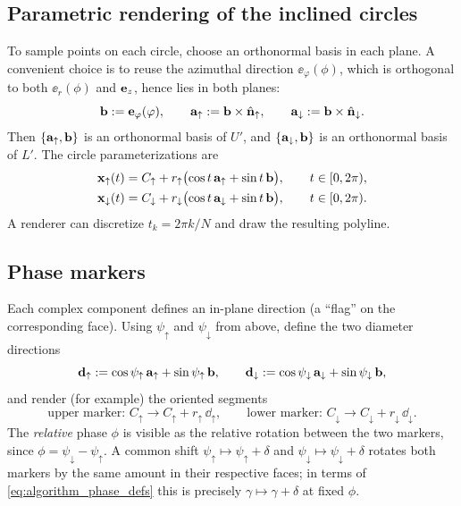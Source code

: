 \subsection{Parametric rendering of the inclined circles}
To sample points on each circle, choose an orthonormal basis in each plane.
A convenient choice is to reuse the azimuthal direction $\ee_\varphi(\phi)$, which is orthogonal to both $\ee_r(\phi)$ and $\mathbf{e}_{z}$, hence lies in both planes:
\begin{equation}
\mathbf{b} := \mathbf{e}_\varphi(\varphi),\qquad
\mathbf{a}_\uparrow := \mathbf{b}\times \hat{\mathbf{n}}_\uparrow,\qquad
\mathbf{a}_\downarrow := \mathbf{b}\times \hat{\mathbf{n}}_\downarrow.
\end{equation}
Then $\{\mathbf{a}_\uparrow,\mathbf{b}\}$ is an orthonormal basis of $U'$, and $\{\mathbf{a}_\downarrow,\mathbf{b}\}$ is an orthonormal basis of $L'$.
The circle parameterizations are
\begin{align}
\label{eq:algorithm_circle_param_up}
\mathbf{x}_\uparrow(t) &= C_\uparrow + r_\uparrow\bigl(\cos t\,\mathbf{a}_\uparrow+\sin t\,\mathbf{b}\bigr),\qquad t\in[0,2\pi),
\\
\label{eq:algorithm_circle_param_down}
\mathbf{x}_\downarrow(t) &= C_\downarrow + r_\downarrow\bigl(\cos t\,\mathbf{a}_\downarrow+\sin t\,\mathbf{b}\bigr),\qquad t\in[0,2\pi).
\end{align}
A renderer can discretize $t_k=2\pi k/N$ and draw the resulting polyline.

\subsection{Phase markers}

Each complex component defines an in-plane direction (a ``flag'' on the corresponding face).
Using $\psi_\uparrow$ and $\psi_\downarrow$ from above, define the two diameter directions
\begin{equation}
\mathbf{d}_\uparrow := \cos\psi_\uparrow\,\mathbf{a}_\uparrow+\sin\psi_\uparrow\,\mathbf{b},
\qquad
\mathbf{d}_\downarrow := \cos\psi_\downarrow\,\mathbf{a}_\downarrow+\sin\psi_\downarrow\,\mathbf{b},
\end{equation}
and render (for example) the oriented segments
\begin{equation}
\label{eq:algorithm_phase_markers}
\text{upper marker: } C_\uparrow \to C_\uparrow + r_\uparrow\,\dd_\uparrow,
\qquad
\text{lower marker: } C_\downarrow \to C_\downarrow + r_\downarrow\,\dd_\downarrow.
\end{equation}
The \emph{relative} phase $\phi$ is visible as the relative rotation between the two markers, since
$\phi=\psi_\downarrow-\psi_\uparrow$.
A common shift $\psi_\uparrow\mapsto\psi_\uparrow+\delta$ and $\psi_\downarrow\mapsto\psi_\downarrow+\delta$
rotates both markers by the same amount in their respective faces; in terms of \eqref{eq:algorithm_phase_defs} this is precisely $\gamma\mapsto\gamma+\delta$ at fixed $\phi$.

